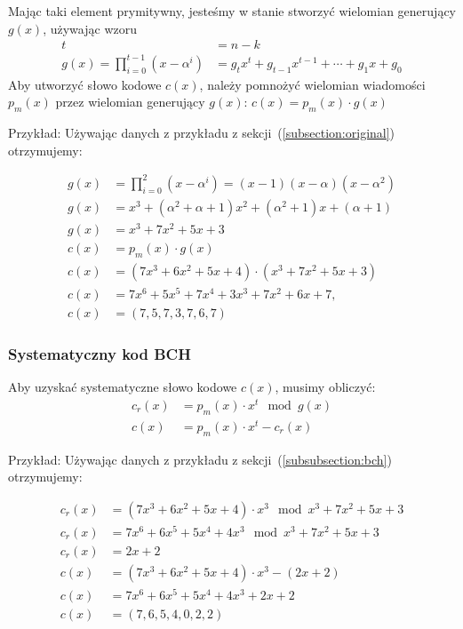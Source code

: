 Mając taki element prymitywny, jesteśmy w stanie stworzyć wielomian generujący $g(x)$, używając wzoru
\begin{align*}
    t &= n - k \\
    g(x) = \prod_{i=0}^{t-1} (x - \alpha^i) &= g_{t}x^t + g_{t-1}x^{t-1} +
    \cdots + g_{1}x + g_{0}
\end{align*}
Aby utworzyć słowo kodowe $c(x)$, należy pomnożyć wielomian wiadomości $p_m(x)$ przez wielomian generujący $g(x)$: $c(x) = p_{m}(x) \cdot g(x)$
\newline
\begin{minipage}{\textwidth}
Przykład:
\newline
Używając danych z przykładu z sekcji~(\ref{subsection:original}) otrzymujemy:
\end{minipage}
\begin{align*}
    g(x) &= \prod_{i=0}^{2} (x - \alpha^i) = (x - 1)(x - \alpha)(x - \alpha^2) \\
    g(x) &= x^3 + (\alpha^2 + \alpha + 1)x^2 + (\alpha^2 + 1)x + (\alpha + 1) \\
    g(x) &= x^3 + 7x^2 + 5x + 3 \\
    c(x) &= p_m(x) \cdot g(x) \\
    c(x) &= (7x^3 + 6x^2 + 5x + 4) \cdot (x^3 + 7x^2 + 5x + 3) \\
    c(x) &= 7x^6 + 5x^5 + 7x^4 + 3x^3 + 7x^2 + 6x + 7, \\
    c(x) &= (7,5,7,3,7,6,7)
\end{align*}

\subsubsection{Systematyczny kod BCH}\label{subsubsection:systematic-bch}

Aby uzyskać systematyczne słowo kodowe $c(x)$, musimy obliczyć:
\begin{align*}
    c_r(x) &= p_m(x) \cdot x^t \mod g(x) \\
    c(x) &= p_m(x) \cdot x^t - c_r(x)
\end{align*}
\begin{minipage}{\textwidth}
Przykład:
\newline
Używając danych z przykładu z sekcji~(\ref{subsubsection:bch}) otrzymujemy:
\end{minipage}
\begin{align*}
    c_r(x) &= (7x^3 + 6x^2 + 5x + 4) \cdot x^3 \mod x^3 + 7x^2 + 5x + 3 \\
    c_r(x) &= 7x^6 + 6x^5 + 5x^4 + 4x^3 \mod x^3 + 7x^2 + 5x + 3 \\
    c_r(x) &= 2x + 2 \\
    c(x) &= (7x^3 + 6x^2 + 5x + 4) \cdot x^3 - (2x + 2) \\
    c(x) &= 7x^6 + 6x^5 + 5x^4 + 4x^3 + 2x + 2 \\
    c(x) &= (7,6,5,4,0,2,2)
\end{align*}

